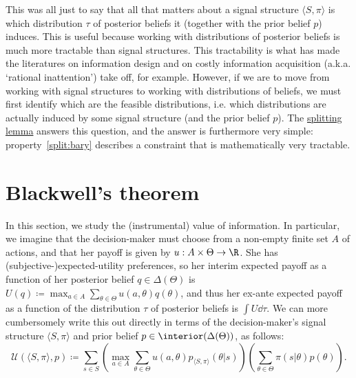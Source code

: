 This was all just to say that all that matters about a signal structure $\langle S, \pi \rangle $ is which distribution $\tau$ of posterior beliefs it (together with the prior belief $p$) induces. This is useful because working with distributions of posterior beliefs is much more tractable than signal structures. This tractability is what has made the literatures on information design and on costly information acquisition (a.k.a. `rational inattention') take off, for example. However, if we are to move from working with signal structures to working with distributions of beliefs, we must first identify which are the feasible distributions, i.e. which distributions are actually induced by some signal structure (and the prior belief $p$). The \hyperref[lemma:split]{splitting lemma} answers this question, and the answer is furthermore very simple: property~\ref{split:bary} describes a constraint that is mathematically very tractable.



\section{Blackwell's theorem}
\label{info:blackwell}

In this section, we study the (instrumental) value of information. In particular, we imagine that the decision-maker must choose from a non-empty finite set $A$ of actions, and that her payoff is given by $u : A \times \Theta \to \R$. She has (subjective-)expected-utility preferences, so her interim expected payoff as a function of her posterior belief $q \in \Delta(\Theta)$ is $U(q) \coloneqq \max_{a \in A} \sum_{\theta \in \Theta} u(a,\theta) q(\theta)$, and thus her ex-ante expected payoff as a function of the distribution $\tau$ of posterior beliefs is $\int U \dd \tau$. We can more cumbersomely write this out directly in terms of the decision-maker's signal structure $\langle S, \pi \rangle $ and prior belief $p \in \interior(\Delta(\Theta))$, as follows:
%
\begin{equation*}
	\mathcal{U}(\langle S, \pi \rangle , p)
	\coloneqq \sum_{s \in S} \left( \max_{a \in A} \sum_{\theta \in \Theta} u(a,\theta) p_{\langle S, \pi \rangle }(\theta|s) \right)
	\left( \sum_{\theta \in \Theta} \pi(s|\theta) p(\theta) \right) .
\end{equation*}

